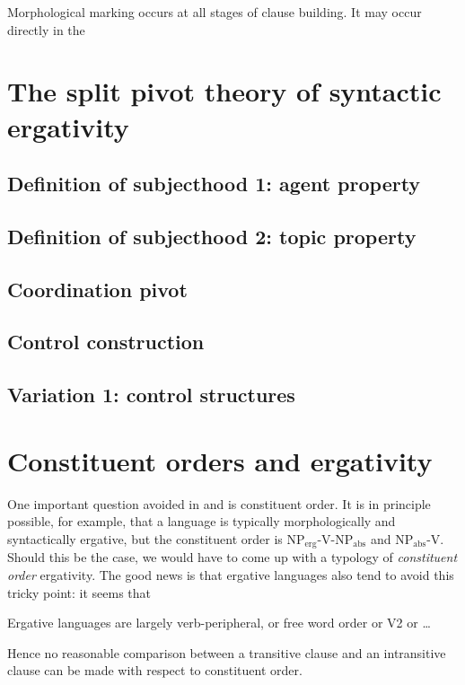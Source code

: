 \documentclass{article}
\begin{document}
Morphological marking occurs at all stages of clause building.
It may occur directly in the 

\section{The split pivot theory of syntactic ergativity}\label{sec:split-pivot}

\subsection{Definition of subjecthood 1: agent property}

\subsection{Definition of subjecthood 2: topic property}

\subsection{Coordination pivot}

\subsection{Control construction}

\subsection{Variation 1: control structures}

\section{Constituent orders and ergativity}

One important question avoided in  and 
is constituent order.
It is in principle possible, for example, 
that a language is typically morphologically and syntactically ergative,
but the constituent order is NP$_{\text{erg}}$-V-NP$_{\text{abs}}$ and NP$_{\text{abs}}$-V.
Should this be the case, 
we would have to come up with a typology of \emph{constituent order} ergativity.
The good news is that ergative languages also tend to avoid this tricky point: 
it seems that \citep{mahajan1994ergativity}
\begin{exe}
    \ex Ergative languages are largely verb-peripheral, or free word order or V2 or \dots
\end{exe}
Hence no reasonable comparison between a transitive clause and an intransitive clause can be made 
with respect to constituent order.
\end{document}
